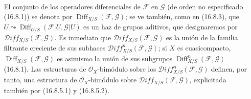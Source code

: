 \begin{env}[16.8.7]
\label{IV.16.8.7}
El conjunto de los operadores diferenciales de $\mathscr{F}$ en
$\mathscr{G}$ (de orden no especificado (16.8.1)) se denota por
$\operatorname{Diff}_{X/S}(\mathscr{F},\mathscr{G})$; se ve también, como en
(16.8.3), que
$U\leadsto\operatorname{Diff}_{U/S}(\mathscr{F}|U,\mathscr{G}|U)$ es un haz de
grupos aditivos, que designaremos por
$\mathscr{D}\!iff_{X/S}(\mathscr{F},\mathscr{G})$. Es inmediato que
$\mathscr{D}\!iff_{X/S}(\mathscr{F},\mathscr{G})$ es la unión de la familia
filtrante creciente de sus subhaces
$\mathscr{D}\!iff_{X/S}^n(\mathscr{F},\mathscr{G})$; si $X$ es
cuasicompacto, $\operatorname{Diff}_{X/S}(\mathscr{F},\mathscr{G})$
es asimismo la unión de sus subgrupos
$\operatorname{Diff}_{X/S}^n(\mathscr{F},\mathscr{G})$ (16.8.1). Las
estructuras de $\mathcal{O}_X$-bimódulo sobre los
$\mathscr{D}\!iff_{X/S}^n(\mathscr{F},\mathscr{G})$ definen, por tanto, una
estructura de $\mathcal{O}_X$-bimódulo sobre
$\mathscr{D}\!iff_{X/S}(\mathscr{F},\mathscr{G})$, explicitada también por
(16.8.5.1) y (16.8.5.2).


\end{env}
